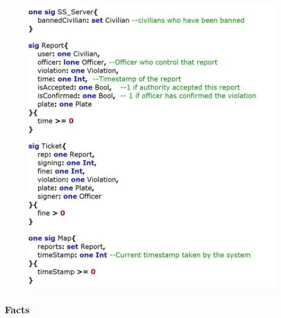 \documentclass[12pt,a4paper]{article}
\begin{document}
\begin{figure}[H]
\begin{adjustwidth}{-25mm}{-25mm}
				\centering
				\includegraphics[width=.7\paperwidth,height=.7\paperheight, keepaspectratio]{Images/Alloy/sig2}
\end{adjustwidth}
\end{figure}

\subsubsection{Facts}
\end{document}
